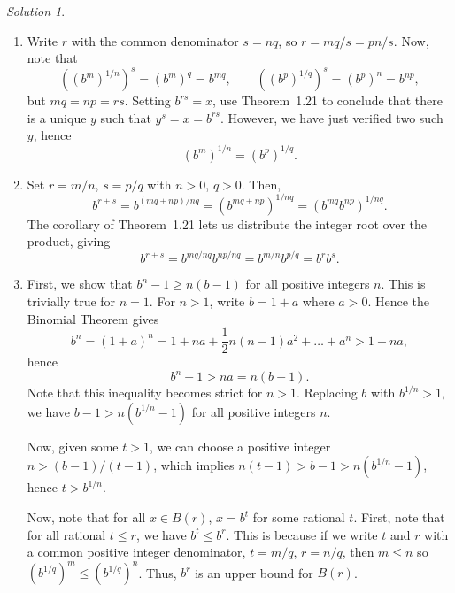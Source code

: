 \documentclass[11pt]{report}
\theoremstyle{remark}
\newtheorem*{solution}{Solution}
\begin{document}
    \begin{solution} \mbox{}
        \begin{enumerate}
            \item Write $r$ with the common denominator $s = nq$, so $r = mq / s =
            pn / s$. Now, note that \[
                \left((b^m)^{1 / n}\right)^s = (b^m)^{q} = b^{mq}, \qquad
                \left((b^p)^{1 / q}\right)^s = (b^p)^{n} = b^{np},
            \] but $mq = np = rs$. Setting $b^{rs} = x$, use Theorem~1.21 to conclude
            that there is a unique $y$ such that $y^s = x = b^{rs}$. However, we
            have just verified two such $y$, hence \[
                (b^m)^{1 / n} = (b^p)^{1 / q}.
            \]
            \item Set $r = m / n$, $s = p / q$ with $n > 0$, $q > 0$. Then, \[
                b^{r + s} = b^{(mq + np) / nq} = (b^{mq + np})^{1 / nq} =
                (b^{mq}b^{np})^{1 / nq}.
            \] The corollary of Theorem~1.21 lets us distribute the integer root
            over the product, giving \[
                b^{r + s} = b^{mq / nq} b^{np / nq} = b^{m / n}b^{p / q} = b^rb^s.
            \] 
            \item First, we show that $b^n - 1 \geq n(b - 1)$ for all positive integers
            $n$. This is trivially true for $n = 1$. For $n > 1$, write $b = 1 + a$
            where $a > 0$. Hence the Binomial Theorem gives \[
                b^n = (1 + a)^n = 1 + na + \frac{1}{2}n(n - 1)a^2 + \dots + a^n > 1
                + na,
            \] hence \[
                b^n - 1 > na = n(b - 1).
            \] Note that this inequality becomes strict for $n > 1$.
            Replacing $b$ with $b^{1 / n} > 1$, we have $b - 1 > n(b^{1 / n} - 1)$ 
            for all positive integers $n$.

            Now, given some $t > 1$, we can choose a positive integer 
            $n > (b - 1) / (t - 1)$, which implies $n(t - 1) > b - 1 > n(b^{1 / n} -
            1)$, hence $t > b^{1 / n}$.

            Now, note that for all $x \in B(r)$, $x = b^t$ for some rational $t$.
            First, note that for all rational $t \leq r$, we have $b^t \leq b^r$.
            This is because if we write $t$ and $r$ with a common positive integer 
            denominator, $t = m / q$, $r = n / q$, then $m \leq n$ so $(b^{1 / q})^m
            \leq (b^{1 / q})^n$. Thus, $b^r$ is an upper bound for $B(r)$.


\end{enumerate}
\end{solution}
\end{document}
